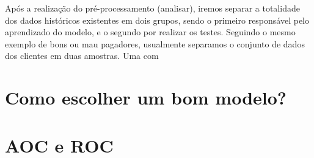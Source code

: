 \documentclass[
]{book}
\begin{document}
Após a realização do pré-processamento (analisar), iremos separar a totalidade dos dados históricos existentes em dois grupos, sendo o primeiro responsável pelo aprendizado do modelo, e o segundo por realizar os testes.
Seguindo o mesmo exemplo de bons ou mau pagadores, usualmente separamos o conjunto de dados dos clientes em duas amostras. Uma com

\hypertarget{como-escolher-um-bom-modelo}{%
\section{Como escolher um bom modelo?}\label{como-escolher-um-bom-modelo}}

\hypertarget{aocroc}{%
\section{AOC e ROC}\label{aocroc}}

  
\end{document}
